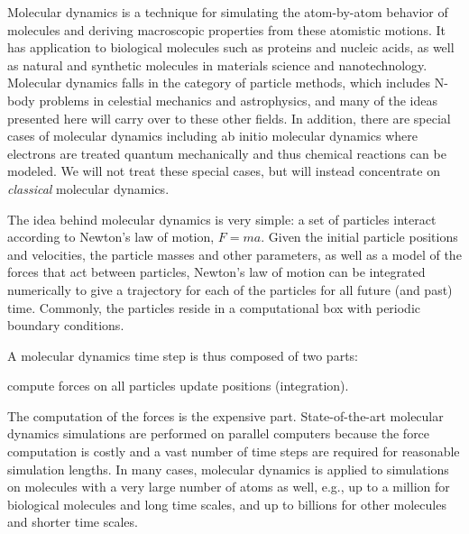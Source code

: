 
Molecular dynamics is a technique for simulating the atom-by-atom
behavior of molecules and deriving macroscopic properties from these
atomistic motions.  It has application to biological molecules such as
proteins and nucleic acids, as well as natural and synthetic molecules
in materials science and nanotechnology.  Molecular dynamics falls in
the category of particle methods, which includes N-body problems in
celestial mechanics and astrophysics, and many of the ideas presented
here will carry over to these other fields.  In addition, there are special
cases of molecular dynamics including ab initio molecular dynamics where
electrons are treated quantum mechanically and thus chemical reactions
can be modeled.  We will not treat these special cases, but will instead
concentrate on {\em classical} molecular dynamics.

The idea behind molecular dynamics is very simple:  a set of particles
interact according to Newton's law of motion, $F=ma$.  Given the
initial particle positions and velocities, the particle masses and other
parameters, as well as a model of the forces that act between
particles, Newton's law of motion can be integrated numerically
to give a trajectory for each of the particles for all future (and past)
time.  Commonly, the particles reside in a computational box with 
periodic boundary conditions.

A molecular dynamics time step is thus composed of two parts:
\begin{algorithmic}[1]
\STATE compute forces on all particles
\STATE update positions (integration).
\end{algorithmic}
The computation of the forces is the expensive part.  State-of-the-art
molecular dynamics simulations are performed on parallel computers
because the force computation is costly and a vast number of time steps
are required for reasonable simulation lengths.  In many cases, molecular
dynamics is applied to simulations on molecules with a very large number
of atoms as well, e.g., up to a million for biological molecules and long time
scales, and up to billions for other molecules and shorter time scales.

